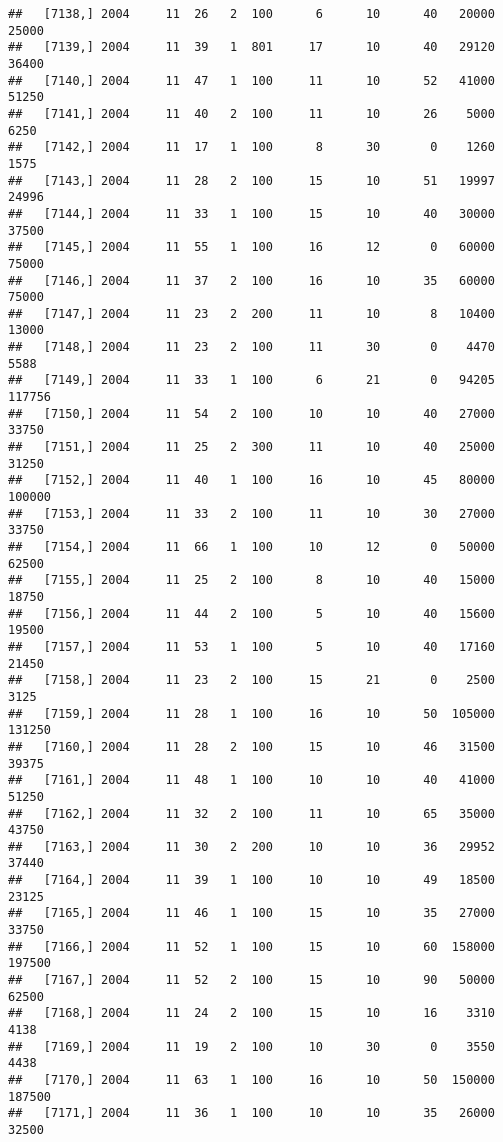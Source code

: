 \documentclass{article}\usepackage[]{graphicx}\usepackage[]{color}
\makeatletter
\newenvironment{kframe}{%
 \def\at@end@of@kframe{}%
 \ifinner\ifhmode%
  \def\at@end@of@kframe{\end{minipage}}%
  \begin{minipage}{\columnwidth}%
 \fi\fi%
 \def\FrameCommand##1{\hskip\@totalleftmargin \hskip-\fboxsep
 \colorbox{shadecolor}{##1}\hskip-\fboxsep
     \hskip-\linewidth \hskip-\@totalleftmargin \hskip\columnwidth}%
 \MakeFramed {\advance\hsize-\width
   \@totalleftmargin\z@ \linewidth\hsize
   \@setminipage}}%
 {\par\unskip\endMakeFramed%
 \at@end@of@kframe}
\newenvironment{knitrout}{}{} %
\makeatother
\begin{document}
\begin{knitrout}
\begin{kframe}
\begin{verbatim}
##   [7138,] 2004     11  26   2  100      6      10      40   20000   25000
##   [7139,] 2004     11  39   1  801     17      10      40   29120   36400
##   [7140,] 2004     11  47   1  100     11      10      52   41000   51250
##   [7141,] 2004     11  40   2  100     11      10      26    5000    6250
##   [7142,] 2004     11  17   1  100      8      30       0    1260    1575
##   [7143,] 2004     11  28   2  100     15      10      51   19997   24996
##   [7144,] 2004     11  33   1  100     15      10      40   30000   37500
##   [7145,] 2004     11  55   1  100     16      12       0   60000   75000
##   [7146,] 2004     11  37   2  100     16      10      35   60000   75000
##   [7147,] 2004     11  23   2  200     11      10       8   10400   13000
##   [7148,] 2004     11  23   2  100     11      30       0    4470    5588
##   [7149,] 2004     11  33   1  100      6      21       0   94205  117756
##   [7150,] 2004     11  54   2  100     10      10      40   27000   33750
##   [7151,] 2004     11  25   2  300     11      10      40   25000   31250
##   [7152,] 2004     11  40   1  100     16      10      45   80000  100000
##   [7153,] 2004     11  33   2  100     11      10      30   27000   33750
##   [7154,] 2004     11  66   1  100     10      12       0   50000   62500
##   [7155,] 2004     11  25   2  100      8      10      40   15000   18750
##   [7156,] 2004     11  44   2  100      5      10      40   15600   19500
##   [7157,] 2004     11  53   1  100      5      10      40   17160   21450
##   [7158,] 2004     11  23   2  100     15      21       0    2500    3125
##   [7159,] 2004     11  28   1  100     16      10      50  105000  131250
##   [7160,] 2004     11  28   2  100     15      10      46   31500   39375
##   [7161,] 2004     11  48   1  100     10      10      40   41000   51250
##   [7162,] 2004     11  32   2  100     11      10      65   35000   43750
##   [7163,] 2004     11  30   2  200     10      10      36   29952   37440
##   [7164,] 2004     11  39   1  100     10      10      49   18500   23125
##   [7165,] 2004     11  46   1  100     15      10      35   27000   33750
##   [7166,] 2004     11  52   1  100     15      10      60  158000  197500
##   [7167,] 2004     11  52   2  100     15      10      90   50000   62500
##   [7168,] 2004     11  24   2  100     15      10      16    3310    4138
##   [7169,] 2004     11  19   2  100     10      30       0    3550    4438
##   [7170,] 2004     11  63   1  100     16      10      50  150000  187500
##   [7171,] 2004     11  36   1  100     10      10      35   26000   32500

\end{verbatim}
\end{kframe}
\end{knitrout}
\end{document}
